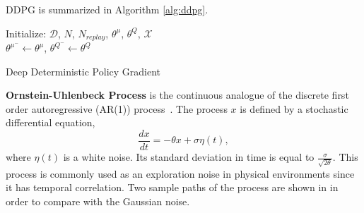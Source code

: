DDPG is summarized in Algorithm \ref{alg:ddpg}. 

\begin{algorithm}[H]
	\SetAlgoLined
	\DontPrintSemicolon %
	Initialize: $\mathcal{D}$, $N$, $N_{replay}$, $\theta^{\mu}$, $\theta^Q$, $\mathcal{X}$ \\
	$\theta^{\mu^-} \leftarrow \theta^{\mu}$, $\theta^{Q^-} \leftarrow \theta^{Q}$ \\
	\caption{Deep Deterministic Policy Gradient}
	\label{alg:ddpg}
\end{algorithm}

\textbf{Ornstein-Uhlenbeck Process} is the continuous analogue of the discrete first order autoregressive (AR(1)) process~\cite{uhlenbeck_theory_1930}. 
The process $x$ is defined by a stochastic differential equation,
\begin{equation}
\label{eqn:ou_process}
\frac{dx}{dt} = -\theta x + \sigma \eta(t),
\end{equation}
where $\eta(t)$ is a white noise. 
Its standard deviation in time is equal to $\frac{\sigma}{\sqrt{2\theta}}$. 
This process is commonly used as an exploration noise in physical environments since it has temporal correlation. 
Two sample paths of the process are shown in   in order to compare with the Gaussian noise.

